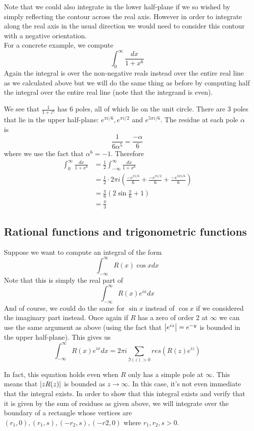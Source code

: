 Note that we could also integrate in the lower half-plane if we so wished by simply reflecting the contour across the real axis. However in order to integrate along the real axis in the usual direction we would need to consider this contour with a negative orientation.\\

For a concrete example, we compute
$$ \int_0^{\infty} \frac{dx}{1 + x^6} $$
Again the integral is over the non-negative reals instead over the entire real line as we calculated above but we will do the same thing as before by computing half the integral over the entire real line (note that the integrand is even).

We see that $\frac{1}{1 + z^6}$ has 6 poles, all of which lie on the unit circle. There are 3 poles that lie in the upper half-plane: $e^{\pi i/6}, e^{\pi i/2}$ and $e^{5\pi i/6}$. The residue at each pole $\alpha$ is
$$ \frac{1}{6\alpha^5} = \frac{-\alpha}{6} $$
where we use the fact that $\alpha^6 = -1$. Therefore 
\begin{align*}
    \int_{0}^{\infty} \frac{dx}{1 + x^6} &= \frac{1}{2} \int_{-\infty}^{\infty} \frac{dx}{1 + x^6}\\
    &= \frac{1}{2} \cdot 2\pi i \left( \frac{-e^{\pi i/6}}{6} + \frac{-e^{\pi i/2}}{6} + \frac{-e^{5\pi i/6}}{6} \right)\\
    &= \frac{\pi}{6} \left( 2 \sin \frac{\pi}{6} + 1 \right)\\
    &= \frac{\pi}{3}
\end{align*}

\subsection{Rational functions and trigonometric functions}
Suppose we want to compute an integral of the form
$$ \int_{-\infty}^{\infty} R(x) \cos x dx $$
Note that this is simply the real part of
$$ \int_{-\infty}^{\infty} R(x) e^{ix} dx $$
And of course, we could do the same for $\sin x$ instead of $\cos x$ if we considered the imaginary part instead.
Once again if $R$ has a zero of order 2 at $\infty$ we can use the same argument as above (using the fact that $\left|e^{iz}\right| = e^{-y}$ is bounded in the upper half-plane). This gives us
$$ \int_{-\infty}^{\infty} R(x) e^{ix} dx = 2\pi i \sum_{\Im(z) > 0} res(R(z) e^{iz}) $$

In fact, this equation holds even when $R$ only has a simple pole at $\infty$. This means that $\left|zR(z)\right|$ is bounded as $z \to \infty$. In this case, it's not even immediate that the integral exists. In order to show that this integral exists and verify that it is given by the sum of residues as given above, we will integrate over the boundary of a rectangle whose vertices are $(r_1, 0), (r_1, s), (-r_2, s), (-r2, 0) $ where $r_1, r_2, s > 0$. 

